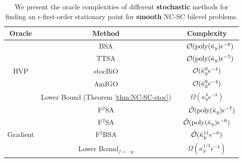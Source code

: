 \documentclass{article}
\begin{document}
\begin{table}[htbp] 
    \centering
     \caption{We present the oracle complexities of different \textbf{stochastic} methods for finding an $\epsilon$-first-order stationary point for \textbf{smooth} NC-SC bilevel problems.}
    \label{tab:stoc}
    \begin{tabular}{c c c}
    \hline 
    Oracle   &  Method & Complexity \\ 
    \hline \addlinespace 
      & BSA \citep{ghadimi2018approximation} & ~~${\mathcal{O}}({\rm poly}(\bar \kappa_y) \epsilon^{-6})$ \\ \addlinespace 
     & TTSA \citep{hong2023two} & ~~${\mathcal{O}}({\rm poly}(\bar \kappa_y)\epsilon^{-5})$ \\ \addlinespace
    HVP & stocBiO \citep{ji2021bilevel} & ${\mathcal{O}}(\bar \kappa_y^{9} \epsilon^{-4})$
    \\ \addlinespace
    & 
    AmIGO \citep{arbel2022amortized} 
    & ${\mathcal{O}}(\bar \kappa_y^{9} \epsilon^{-4})$
    \\ \addlinespace
    &  \cellcolor{gray!20} Lower Bound (Theorem \ref{thm:NC-SC-stoc}) & 
     \cellcolor{gray!20}
    $\Omega(\kappa_y^{4} \epsilon^{-4})$ \\ 
    \hline \addlinespace 
    & F${}^2$SA \citep{kwon2023fully} & ~~~$\tilde {{\mathcal{O}}}({\rm poly}(\bar \kappa_y) \epsilon^{-7})$ \\
    \addlinespace 
    & F${}^2$SA \citep{kwon2024complexity} & $\tilde {{\mathcal{O}}}({\rm poly}(\bar \kappa_y) \epsilon^{-6} )$ 
   \\ \addlinespace
    Gradient &  F${}^2$BSA \citep{chen2023near} & $\tilde {{\mathcal{O}}}(\bar \kappa_y^{11} \epsilon^{-6})$ \\ 
    \addlinespace 
    & Lower Bound$_{f=-g}$ \citep{li2021complexity} %
    & $\Omega( \kappa_y^{1/3} \epsilon^{-4})$ \\

\end{tabular}
\end{table}
\end{document}
